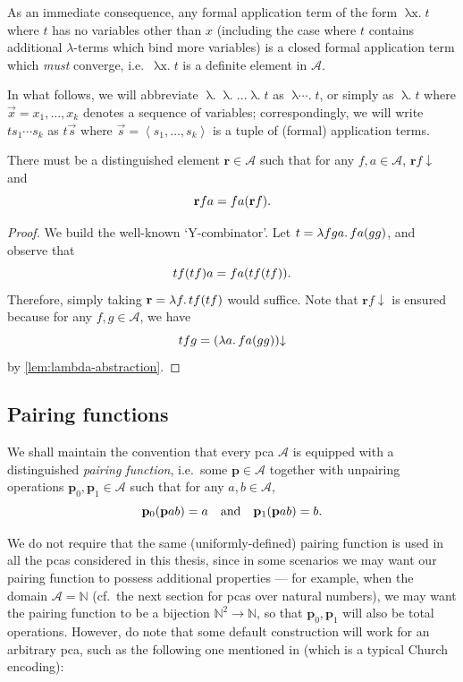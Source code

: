 \documentclass[12pt,openany]{book}
\makeatletter
\newcommand\indg[1]{\index{A@General!#1}}
\theoremstyle{plain}
\theoremstyle{definition}
\newcommand\tuple[1]{\left\langle #1 \right\rangle}
\newcommand\oplam[1]{\mathop{\lambda #1.}}
\newcommand\bp{\mathbf{p}}
\newcommand\br{\mathbf{r}}
\makeatother
\begin{document}
As an immediate consequence, any formal application term of the form $\oplam{x} t$ where $t$ has no variables other than $x$ (including the case where $t$ contains additional $\lambda$-terms which bind more variables) is a closed formal application term which \emph{must} converge, i.e.\ $\oplam{x} t$ is a definite element in $\mathcal{A}$.

In what follows, we will abbreviate $\oplam{x_1} \oplam{x_2} \ldots \oplam{x_k} t$ as $\oplam{x_1 x_2 \cdots x_k} t$, or simply as $\oplam{\vec{x}} t$ where $\vec{x} = x_1, \ldots, x_k$ denotes a sequence of variables; correspondingly, we will write $ts_1 \cdots s_k$ as $t \vec{s}$ where $\vec{s} = \tuple{s_1, \ldots, s_k}$ is a tuple of (formal) application terms.

\begin{corollary}
  \label{cor:recursion-theorem}
  There must be a distinguished element $\br \in \mathcal{A}$ such that for any $f, a \in \mathcal{A}$, $\br f {\downarrow}$ and
  \[\br fa = fa \mleft(\br f\mright).\]
\end{corollary}

\begin{proof}
  We build the well-known `Y-combinator'. Let $t = \oplam{fga} fa \mleft(gg\mright)$, and observe that
  \[tf \mleft(tf\mright) a = fa \mleft(tf \mleft(tf\mright)\mright).\]
  Therefore, simply taking $\br = \oplam{f} tf \mleft(tf\mright)$ would suffice. Note that $\br f {\downarrow}$ is ensured because for any $f, g \in \mathcal{A}$, we have
  \[tfg = \mleft(\oplam{a} fa \mleft(gg\mright)\mright) {\downarrow}\]
  by \autoref{lem:lambda-abstraction}.
\end{proof}

\subsection*{Pairing functions}

We shall maintain the convention that every pca $\mathcal{A}$ is equipped with a distinguished \emph{pairing function}\indg{pairing function}, i.e.\ some $\bp \in \mathcal{A}$ together with unpairing operations $\bp_0, \bp_1 \in \mathcal{A}$ such that for any $a, b \in \mathcal{A}$,
\[\bp_0 \mleft(\bp ab\mright) = a \quad \text{and} \quad \bp_1 \mleft(\bp ab\mright) = b.\]

We do not require that the same (uniformly-defined) pairing function is used in all the pcas considered in this thesis, since in some scenarios we may want our pairing function to possess additional properties --- for example, when the domain $\mathcal{A} = \mathbb{N}$ (cf.\ the next section for pcas over natural numbers), we may want the pairing function to be a bijection $\mathbb{N}^2 \rightarrow \mathbb{N}$, so that $\bp_0, \bp_1$ will also be total operations. However, do note that some default construction will work for an arbitrary pca, such as the following one mentioned in \cite{frittaion-rathjen20-realizability-ist} (which is a typical Church encoding):
\end{document}
